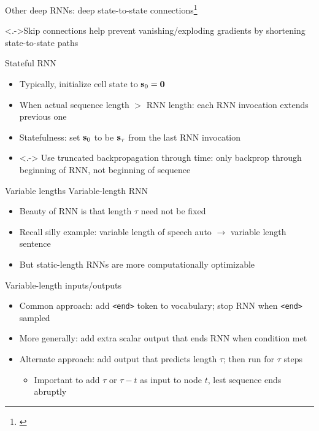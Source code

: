 \setcounter{footnote}{0}

\begin{frame}{Other deep RNNs: deep state-to-state connections\footnote{\citet{PascanuICLR14}}}
    

    \vspace{-1em}
    \uncover<.->{Skip connections help prevent vanishing/exploding gradients by shortening state-to-state paths
}
\end{frame}

\begin{frame}{Stateful RNN}
    \begin{itemize}[<+->]
        \item Typically, initialize cell state to $\mathbf{s}_0 = \mathbf{0}$
        \item When actual sequence length $>$ RNN length: each RNN invocation extends previous one
        \item Statefulness: set $\mathbf{s}_0$ to be $\mathbf{s}_\tau$ from the last RNN invocation
        \item<.-> Use truncated backpropagation through time: only backprop through beginning of RNN, not beginning of sequence
    \end{itemize}

    \centering
    
\end{frame}

\begin{frame}{Variable lengths}
    Variable-length RNN
    \begin{itemize}
        \item Beauty of RNN is that length $\tau$ need not be fixed
        \item Recall silly example: variable length of speech auto $\to$ variable length sentence
        \item But static-length RNNs are more computationally optimizable
    \end{itemize}
    \pause

    Variable-length inputs/outputs
    \begin{itemize}
        \item Common approach: add \texttt{<end>} token to vocabulary; stop RNN when \texttt{<end>} sampled
        \item More generally: add extra scalar output that ends RNN when condition met
        \item Alternate approach: add output that predicts length $\tau$; then run for $\tau$ steps
        \begin{itemize}
            \item Important to add $\tau$ or $\tau - t$ as input to node $t$, lest sequence ends abruptly
        \end{itemize}
    \end{itemize}
\end{frame}

